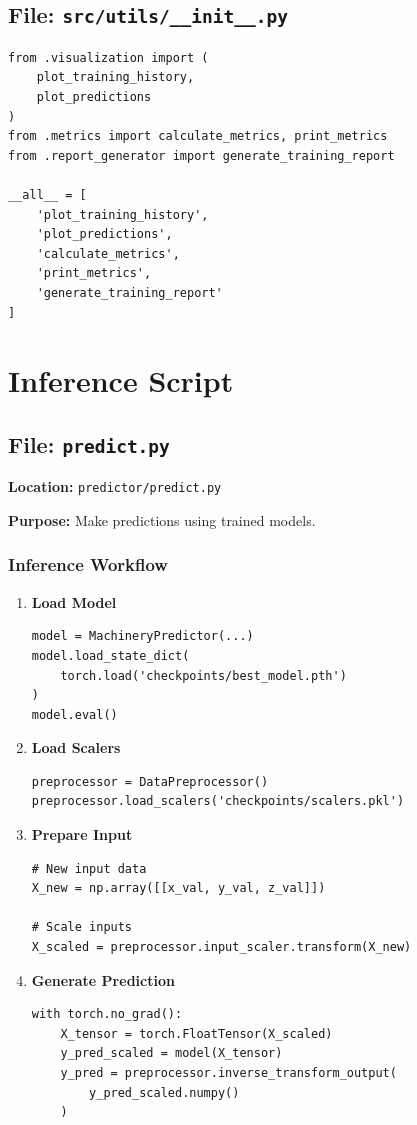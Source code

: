 \documentclass[11pt,a4paper]{article}
\begin{document}
\subsection{File: \texttt{src/utils/\_\_init\_\_.py}}

\begin{lstlisting}
from .visualization import (
    plot_training_history,
    plot_predictions
)
from .metrics import calculate_metrics, print_metrics
from .report_generator import generate_training_report

__all__ = [
    'plot_training_history',
    'plot_predictions',
    'calculate_metrics',
    'print_metrics',
    'generate_training_report'
]
\end{lstlisting}

\newpage
\section{Inference Script}

\subsection{File: \texttt{predict.py}}

\textbf{Location:} \texttt{predictor/predict.py}

\textbf{Purpose:} Make predictions using trained models.

\subsubsection{Inference Workflow}

\begin{enumerate}
    \item \textbf{Load Model}
    \begin{lstlisting}
model = MachineryPredictor(...)
model.load_state_dict(
    torch.load('checkpoints/best_model.pth')
)
model.eval()
    \end{lstlisting}

    \item \textbf{Load Scalers}
    \begin{lstlisting}
preprocessor = DataPreprocessor()
preprocessor.load_scalers('checkpoints/scalers.pkl')
    \end{lstlisting}

    \item \textbf{Prepare Input}
    \begin{lstlisting}
# New input data
X_new = np.array([[x_val, y_val, z_val]])

# Scale inputs
X_scaled = preprocessor.input_scaler.transform(X_new)
    \end{lstlisting}

    \item \textbf{Generate Prediction}
    \begin{lstlisting}
with torch.no_grad():
    X_tensor = torch.FloatTensor(X_scaled)
    y_pred_scaled = model(X_tensor)
    y_pred = preprocessor.inverse_transform_output(
        y_pred_scaled.numpy()
    )
    \end{lstlisting}
\end{enumerate}
\end{document}
